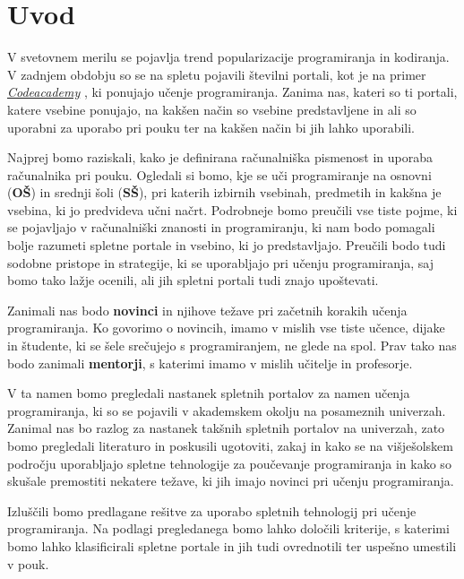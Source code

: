 \section{Uvod}
\label{sec:Uvod}


V svetovnem merilu se pojavlja trend popularizacije programiranja
in kodiranja. V zadnjem obdobju so se na spletu pojavili številni
portali, kot je na primer
\emph{\href{https://www.codecademy.com/}{Codeacademy}}
\cite{web:codeacademy}, ki ponujajo učenje programiranja. Zanima nas,
kateri so ti portali, katere vsebine ponujajo, na kakšen način so
vsebine predstavljene in ali so uporabni za uporabo pri pouku ter na
kakšen način bi jih lahko uporabili.

Najprej bomo raziskali, kako je definirana računalniška pismenost in
uporaba računalnika pri pouku. Ogledali si bomo, kje se uči
programiranje na osnovni (\textbf{OŠ}) in srednji šoli
(\textbf{SŠ}), pri katerih izbirnih vsebinah, predmetih in kakšna je
vsebina, ki jo predvideva učni načrt. Podrobneje bomo preučili vse
tiste pojme, ki se pojavljajo v računalniški znanosti in
programiranju, ki nam bodo pomagali bolje razumeti spletne portale in
vsebino, ki jo predstavljajo. Preučili bodo tudi sodobne pristope in
strategije, ki se uporabljajo pri učenju programiranja, saj bomo tako
lažje ocenili, ali jih spletni portali tudi znajo upoštevati.

Zanimali nas bodo \textbf{novinci} in njihove težave pri začetnih
korakih učenja programiranja. Ko govorimo o novincih, imamo v mislih
vse tiste učence, dijake in študente, ki se šele srečujejo s
programiranjem, ne glede na spol. Prav tako nas bodo zanimali
\textbf{mentorji}, s katerimi imamo v mislih učitelje in profesorje.

V ta namen bomo pregledali nastanek spletnih portalov za namen učenja
programiranja, ki so se pojavili v akademskem okolju na posameznih
univerzah. Zanimal nas bo razlog za nastanek takšnih spletnih portalov
na univerzah, zato bomo pregledali literaturo in poskusili ugotoviti,
zakaj in kako se na višješolskem področju uporabljajo spletne
tehnologije za poučevanje programiranja in kako so skušale premostiti
nekatere težave, ki jih imajo novinci pri učenju programiranja.

Izluščili bomo predlagane rešitve za uporabo spletnih tehnologij pri
učenje programiranja. Na podlagi pregledanega bomo lahko določili
kriterije, s katerimi bomo lahko klasificirali spletne portale in jih
tudi ovrednotili ter uspešno umestili v pouk.



